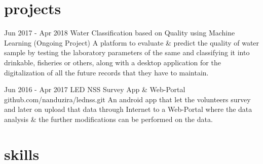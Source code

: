 \documentclass[]{friggeri-cv}
\begin{document}
\section{projects}
\begin{entrylist}
	
	\entry
	{Jun 2017 - Apr 2018}
	{Water Classification based on Quality using Machine Learning {\normalfont }}
	{(Ongoing Project)}
	{A platform to evaluate \& predict the quality of water sample by testing the laboratory parameters of the same and classifying it into drinkable, fisheries or others, along with a desktop application for the digitalization of all the future records that they have to maintain.}
	
	
	\entry
	{Jun 2016 - Apr 2017}
	{LED NSS Survey App \& Web-Portal}
	{github.com/nanduzira/lednss.git }
	{An android app that let the volunteers survey and later on upload that data through Internet to a Web-Portal where the data analysis \& the further modifications can be performed on the data.}
	
\end{entrylist}
\newline

\section{skills}
\begin{entrylist}
\end{entrylist}
\newline

\newpage
\end{document}
